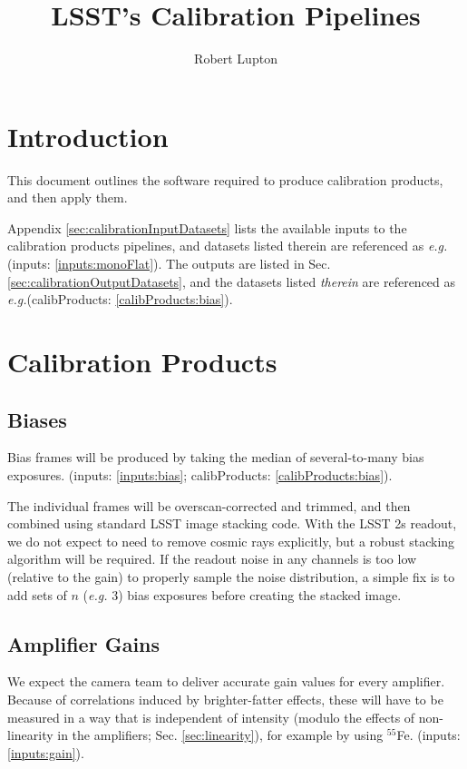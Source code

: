\documentclass[12pt]{article}
\newcommand{\eg}{\textit{e.g.}\xspace}
\newcommand{\inputData}[1]{(inputs: \ref{inputs:#1})}
\newcommand{\outputData}[1]{(calibProducts: \ref{calibProducts:#1})}
\newcommand{\inputOutputData}[1]{(inputs: \ref{inputs:#1}; calibProducts: \ref{calibProducts:#1})}
\newcommand{\secRef}[1]{Sec. \ref{sec:#1}}
\begin{document}
\title{LSST's Calibration Pipelines}
\author{Robert Lupton}
\maketitle
\tableofcontents

\section{Introduction}

This document outlines the software required to produce calibration products, and then apply them.

Appendix \ref{sec:calibrationInputDatasets} lists the available inputs to the calibration products pipelines,
and datasets listed therein are referenced as \eg \inputData{monoFlat}.  The outputs are listed in
\secRef{calibrationOutputDatasets}, and the datasets listed \textit{therein} are referenced as
\eg \outputData{bias}.

\section{Calibration Products}

\subsection{Biases}

Bias frames will be produced by taking the median of several-to-many bias exposures.
\inputOutputData{bias}.

The individual frames will be overscan-corrected and trimmed, and then combined using standard LSST image
stacking code.  With the LSST 2s readout, we do not expect to need to remove cosmic rays explicitly, but a
robust stacking algorithm will be required.  If the readout noise in any channels is too low (relative to the
gain) to properly sample the noise distribution, a simple fix is to add sets of $n$ (\eg 3) bias exposures
before creating the stacked image.

\subsection{Amplifier Gains}
\label{sec:gains}

We expect the camera team to deliver accurate gain values for every amplifier.  Because of
correlations induced by brighter-fatter effects, these will have to be measured in a way that is independent
of intensity (modulo the effects of non-linearity in the amplifiers; \secRef{linearity}), for example
by using $^{55}$Fe. \inputData{gain}.
\end{document}
